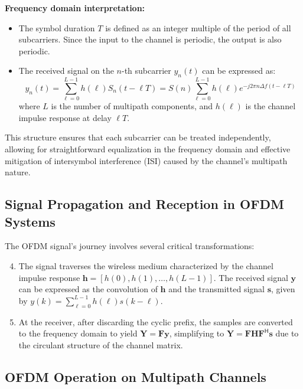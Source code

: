 \textbf{Frequency domain interpretation:}
\begin{itemize}
    \item The symbol duration \(T\) is defined as an integer multiple of the period of all subcarriers. Since the input to the channel is periodic, the output is also periodic.
    \item The received signal on the \(n\)-th subcarrier \(y_n(t)\) can be expressed as:
    \begin{equation}
        y_n(t) = \sum_{\ell=0}^{L-1} h(\ell)S_n(t - \ell T) = S(n) \sum_{\ell=0}^{L-1} h(\ell)e^{-j2\pi n \Delta f (t - \ell T)}
    \end{equation}
    where \(L\) is the number of multipath components, and \(h(\ell)\) is the channel impulse response at delay \(\ell T\).
\end{itemize}

This structure ensures that each subcarrier can be treated independently, allowing for straightforward equalization in the frequency domain and effective mitigation of intersymbol interference (ISI) caused by the channel's multipath nature.



\subsection*{Signal Propagation and Reception in OFDM Systems}

The OFDM signal's journey involves several critical transformations:

\begin{enumerate}
    \setcounter{enumi}{3}
    \item The signal traverses the wireless medium characterized by the channel impulse response \(\mathbf{h} = [h(0), h(1), \ldots, h(L - 1)]\). The received signal \(\mathbf{y}\) can be expressed as the convolution of \(\mathbf{h}\) and the transmitted signal \(\mathbf{s}\), given by \(y(k) = \sum_{\ell=0}^{L-1} h(\ell)s(k - \ell)\).
    \item At the receiver, after discarding the cyclic prefix, the samples are converted to the frequency domain to yield \(\mathbf{Y} = \mathbf{F}\mathbf{y}\), simplifying to \(\mathbf{Y} = \mathbf{F}\mathbf{H}\mathbf{F}^\mathsf{H}\mathbf{s}\) due to the circulant structure of the channel matrix.
\end{enumerate}

\subsection*{OFDM Operation on Multipath Channels}

